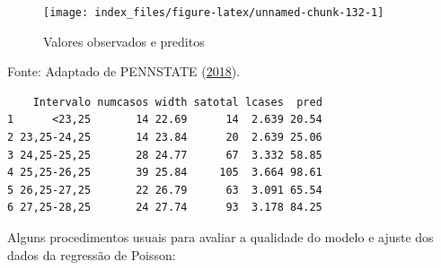 \documentclass[12pt,brazil,oneside]{book}
\newenvironment{Shaded}{\begin{snugshade}}{\end{snugshade}}
\newcommand{\DataTypeTok}[1]{\textcolor[rgb]{0.13,0.29,0.53}{#1}}
\newcommand{\DecValTok}[1]{\textcolor[rgb]{0.00,0.00,0.81}{#1}}
\newcommand{\KeywordTok}[1]{\textcolor[rgb]{0.13,0.29,0.53}{\textbf{#1}}}
\newcommand{\NormalTok}[1]{#1}
\newcommand{\OperatorTok}[1]{\textcolor[rgb]{0.81,0.36,0.00}{\textbf{#1}}}
\newcommand{\StringTok}[1]{\textcolor[rgb]{0.31,0.60,0.02}{#1}}
\begin{document}
\begin{Shaded}
\end{Shaded}

\begin{figure}[H]

{\centering \texttt{[image: index\_files/figure-latex/unnamed-chunk-132-1]} 

}

\caption{Valores observados e preditos}\label{fig:unnamed-chunk-132}
\end{figure}

Fonte: Adaptado de PENNSTATE (\protect\hyperlink{ref-penn2018}{2018}).

\begin{Shaded}
\end{Shaded}

\begin{verbatim}
    Intervalo numcasos width satotal lcases  pred
1      <23,25       14 22.69      14  2.639 20.54
2 23,25-24,25       14 23.84      20  2.639 25.06
3 24,25-25,25       28 24.77      67  3.332 58.85
4 25,25-26,25       39 25.84     105  3.664 98.61
5 26,25-27,25       22 26.79      63  3.091 65.54
6 27,25-28,25       24 27.74      93  3.178 84.25
\end{verbatim}

Alguns procedimentos usuais para avaliar a qualidade do modelo e ajuste dos dados da regressão de Poisson:
\end{document}
